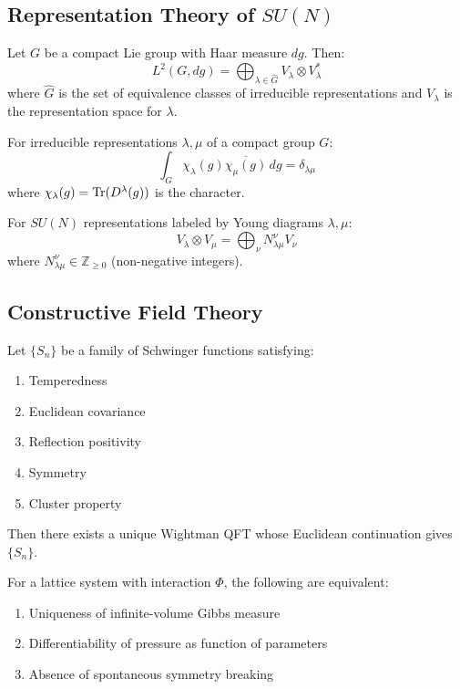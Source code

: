 \subsection{Representation Theory of \texorpdfstring{$SU(N)$}{SU(N)}}

\begin{theorem}
Let $G$ be a compact Lie group with Haar measure $dg$. Then:
\[
L^2(G, dg) = \bigoplus_{\lambda \in \hat{G}} V_\lambda \otimes V_\lambda^*
\]
where $\hat{G}$ is the set of equivalence classes of irreducible representations 
and $V_\lambda$ is the representation space for $\lambda$.
\end{theorem}

\begin{theorem}
For irreducible representations $\lambda, \mu$ of a compact group $G$:
\[
\int_G \chi_\lambda(g) \overline{\chi_\mu(g)} \, dg = \delta_{\lambda\mu}
\]
where $\chi_\lambda(g) = \operatorname{Tr}(D^\lambda(g))$ is the character.
\end{theorem}

\begin{theorem}
For $SU(N)$ representations labeled by Young diagrams $\lambda, \mu$:
\[
V_\lambda \otimes V_\mu = \bigoplus_\nu N_{\lambda\mu}^\nu V_\nu
\]
where $N_{\lambda\mu}^\nu \in \mathbb{Z}_{\geq 0}$ (non-negative integers).
\end{theorem}

\subsection{Constructive Field Theory}

\begin{theorem}
Let $\{S_n\}$ be a family of Schwinger functions satisfying:
\begin{enumerate}[label=(OS\arabic*)]
\item Temperedness
\item Euclidean covariance
\item Reflection positivity
\item Symmetry
\item Cluster property
\end{enumerate}
Then there exists a unique Wightman QFT whose Euclidean continuation gives $\{S_n\}$.
\end{theorem}

\begin{theorem}
For a lattice system with interaction $\Phi$, the following are equivalent:
\begin{enumerate}[label=(\roman*)]
\item Uniqueness of infinite-volume Gibbs measure
\item Differentiability of pressure as function of parameters
\item Absence of spontaneous symmetry breaking
\end{enumerate}
\end{theorem}

